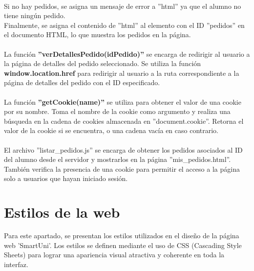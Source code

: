 \documentclass[12pt]{report}
\begin{document}
\\
Si no hay pedidos, se asigna un mensaje de error a ''html'' ya que el alumno no tiene ningún pedido.
\\
Finalmente, se asigna el contenido de ''html'' al elemento con el ID ''pedidos'' en el documento HTML, lo que muestra los pedidos en la página.
\\\\
La función \textbf{''verDetallesPedido(idPedido)''} se encarga de redirigir al usuario a la página de detalles del pedido seleccionado. Se utiliza la función \textbf{window.location.href} para redirigir al usuario a la ruta correspondiente a la página de detalles del pedido con el ID especificado.
\\\\
La función \textbf{''getCookie(name)''} se utiliza para obtener el valor de una cookie por su nombre. Toma el nombre de la cookie como argumento y realiza una búsqueda en la cadena de cookies almacenada en ''document.cookie''. Retorna el valor de la cookie si se encuentra, o una cadena vacía en caso contrario.
\\\\
El archivo ''listar\_pedidos.js'' se encarga de obtener los pedidos asociados al ID del alumno desde el servidor y mostrarlos en la página ''mis\_pedidos.html''. También verifica la presencia de una cookie para permitir el acceso a la página solo a usuarios que hayan iniciado sesión.

\section{Estilos de la web}
Para este apartado, se presentan los estilos utilizados en el diseño de la página web 'SmartUni'. Los estilos se definen mediante el uso de CSS (Cascading Style Sheets) para lograr una apariencia visual atractiva y coherente en toda la interfaz.
\end{document}
